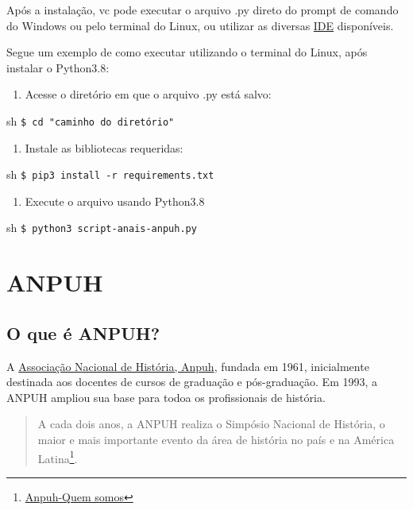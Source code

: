 \documentclass[
]{book}
\providecommand{\tightlist}{%
  \setlength{\itemsep}{0pt}\setlength{\parskip}{0pt}}
\begin{document}
Após a instalação, vc pode executar o arquivo .py direto do prompt de comando do Windows ou pelo terminal do Linux, ou utilizar as diversas \href{https://pt.wikipedia.org/wiki/Ambiente_de_desenvolvimento_integrado}{IDE} disponíveis.

Segue um exemplo de como executar utilizando o terminal do Linux, após instalar o Python3.8:

\begin{enumerate}
\def\labelenumi{\arabic{enumi}.}
\tightlist
\item
  Acesse o diretório em que o arquivo .py está salvo:
\end{enumerate}

sh
\texttt{\$\ cd\ "caminho\ do\ diretório"}

\begin{enumerate}
\def\labelenumi{\arabic{enumi}.}
\tightlist
\item
  Instale as bibliotecas requeridas:
\end{enumerate}

sh
\texttt{\$\ pip3\ install\ -r\ requirements.txt}

\begin{enumerate}
\def\labelenumi{\arabic{enumi}.}
\tightlist
\item
  Execute o arquivo usando Python3.8
\end{enumerate}

sh
\texttt{\$\ python3\ script-anais-anpuh.py}

\hypertarget{anpuh}{%
\chapter{ANPUH}\label{anpuh}}

\hypertarget{o-que-uxe9-anpuh}{%
\section{O que é ANPUH?}\label{o-que-uxe9-anpuh}}

A \href{https://anpuh.org.br/index.php}{Associação Nacional de História, Anpuh}, fundada em 1961, inicialmente destinada aos docentes de cursos de graduação e pós-graduação. Em 1993, a ANPUH ampliou sua base para todoa os profissionais de história.

\begin{quote}
A cada dois anos, a ANPUH realiza o Simpósio Nacional de História, o maior e mais importante evento da área de história no país e na América Latina\footnote{\href{https://anpuh.org.br/index.php/quem-somos}{Anpuh-Quem somos}}.
\end{quote}
\end{document}
